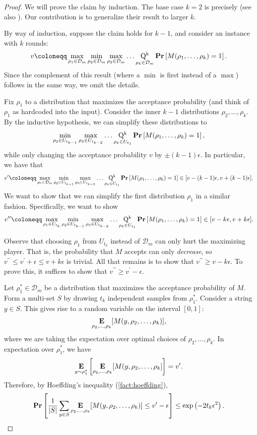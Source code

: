 \documentclass[11pt]{article}
\newcommand{\eps}{\epsilon}
\theoremstyle{definition}
\renewcommand{\Pr}{\mathop{\bf Pr\/}}
\newcommand{\E}{\mathop{\bf E\/}}
\newcommand{\calD}{\mathcal{D}}
\newcommand{\abs}[1]{\left\lvert #1 \right\rvert}
\begin{document}
\begin{proof}
We will prove the claim by induction. The base case $k=2$ is precisely \cite[Theorem 2]{lipton1994simple} (see also \cite{ALTHOFER1994339}). Our contribution is to generalize their result to larger $k$. 


    By way of induction, suppose the claim holds for $k-1$, and consider an instance with $k$ rounds:
    \[
        v \coloneqq \max_{\rho_1 \in\calD_m} \min_{\rho_2 \in\calD_m} \max_{\rho_3 \in\calD_m} \dots \operatorname*{Q^k}_{\rho_{k} \in\calD_m} \Pr\left[M(\rho_1,\dots,\rho_k) = 1\right].
    \]
   Since the complement of this result (where a $\min$ is first instead of a $\max$) follows in the same way, we omit the details.
    
    Fix $\rho_1$ to a distribution that maximizes the acceptance probability (and think of $\rho_1$ as hardcoded into the input). 
    Consider the inner $k-1$ distributions $\rho_2, \ldots, \rho_k$. By the inductive hypothesis, we can simplify these distributions to 
    \[
   \min_{\rho_2 \in U_{t_{k-1}}} \max_{\rho_3 \in U_{t_{k-2}}} \dots \operatorname*{Q^k}_{\rho_{k} \in U_{t_1}} \Pr\left[M(\rho_1,\dots,\rho_k) = 1\right], 
    \]
    while only changing the acceptance probability $v$ by $\pm (k-1)\eps$. 
    In particular, we have that 
    \[
        v^\prime \coloneqq \max_{\rho_1 \in\calD_m} \min_{\rho_2 \in U_{t_{k-1}}} \max_{\rho_3 \in U_{t_{k-2}}} \dots \operatorname*{Q^k}_{\rho_{k} \in U_{t_1}} \Pr\left[M(\rho_1,\dots,\rho_k) = 1\right] \in [v - (k-1) \eps, v + (k-1)\eps]. 
    \]
    We want to show that we can simplify the first distribution $\rho_1$ in a similar fashion. Specifically, we want to show 
    \[
     v^{\prime\prime} \coloneqq  \max_{\rho_1 \in U_{t_k}} \min_{\rho_2 \in U_{t_{k-1}}} \max_{\rho_3 \in U_{t_{k-2}}} \dots \operatorname*{Q^k}_{\rho_{k} \in U_{t_1}} \Pr\left[M(\rho_1,\dots,\rho_k) = 1\right] \in [v - k \eps, v + k\eps]. 
    \]
    
    Observe that choosing $\rho_1$ from $U_{t_k}$ instead of $\calD_m$ can only hurt the maximizing player. That is, the probability that $M$ accepts can only \emph{decrease}, so $v^{\prime\prime} \leq v^\prime + \eps \leq v + k\eps$ is trivial. 
    All that remains is to show that $v^{\prime\prime} \geq v - k\eps$. 
    To prove this, it suffices to show that $v^{\prime\prime} \geq v^\prime - \eps$.
    
    Let $\rho_1^* \in \calD_m$ be a distribution that maximizes the acceptance probability of $M$. 
    Form a multi-set $S$ by drawing $t_k$ independent samples from $\rho_1^*$.
    Consider a string $y \in S$. This gives rise to a random variable on the interval $[0,1]$: 
    \[
    \E_{\rho_2, \ldots, \rho_k}[M(y, \rho_2, \ldots, \rho_k)], 
    \]
    where we are taking the expectation over optimal choices of $\rho_2, \ldots, \rho_k$.
    In expectation over $\rho_1^*$, we have 
    \[
    \E_{y \sim \rho_1^*}\left[ 
    \E_{\rho_2, \ldots, \rho_k}[M(y, \rho_2, \ldots, \rho_k]\right] = v^\prime.
    \]
    Therefore, by Hoeffding's inequality (\cref{fact:hoeffding}), 
    \[
    \Pr\left[ \frac{1}{\abs{S}} \sum_{y \in S} \E_{\rho_2, \ldots, \rho_k}[M(y, \rho_2, \ldots, \rho_k)] \leq v^\prime - \eps \right] \leq \exp\left(-2 t_k \eps^2\right).
    \]
    

\end{proof}
\end{document}
